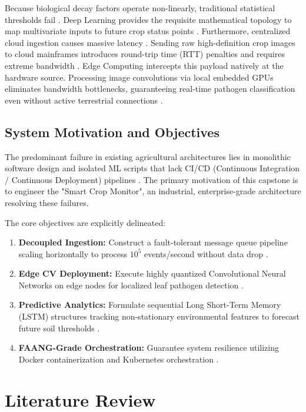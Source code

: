 \documentclass[12pt, a4paper]{report}
\begin{document}
Because biological decay factors operate non-linearly, traditional statistical thresholds fail \cite{r10}. Deep Learning provides the requisite mathematical topology to map multivariate inputs to future crop status points \cite{r11}. Furthermore, centralized cloud ingestion causes massive latency \cite{r12}. Sending raw high-definition crop images to cloud mainframes introduces round-trip time (RTT) penalties and requires extreme bandwidth \cite{r13}. Edge Computing intercepts this payload natively at the hardware source. Processing image convolutions via local embedded GPUs eliminates bandwidth bottlenecks, guaranteeing real-time pathogen classification even without active terrestrial connections \cite{r14}.

\section{System Motivation and Objectives}
The predominant failure in existing agricultural architectures lies in monolithic software design and isolated ML scripts that lack CI/CD (Continuous Integration / Continuous Deployment) pipelines \cite{r15}. The primary motivation of this capstone is to engineer the "Smart Crop Monitor", an industrial, enterprise-grade architecture resolving these failures.

The core objectives are explicitly delineated:
\begin{enumerate}
    \item \textbf{Decoupled Ingestion:} Construct a fault-tolerant message queue pipeline scaling horizontally to process $10^5$ events/second without data drop \cite{r16}.
    \item \textbf{Edge CV Deployment:} Execute highly quantized Convolutional Neural Networks on edge nodes for localized leaf pathogen detection \cite{r17}.
    \item \textbf{Predictive Analytics:} Formulate sequential Long Short-Term Memory (LSTM) structures tracking non-stationary environmental features to forecast future soil thresholds \cite{r18}.
    \item \textbf{FAANG-Grade Orchestration:} Guarantee system resilience utilizing Docker containerization and Kubernetes orchestration \cite{r19}.
\end{enumerate}

\chapter{Literature Review}
\end{document}

